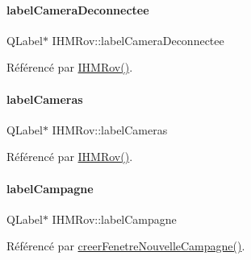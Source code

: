 \mbox{\label{class_i_h_m_rov_ac3b86335f9903c2a71eafe941d5c302b}} 
\paragraph{\texorpdfstring{label\+Camera\+Deconnectee}{labelCameraDeconnectee}}
{\footnotesize\ttfamily Q\+Label$\ast$ I\+H\+M\+Rov\+::label\+Camera\+Deconnectee\hspace{0.3cm}{\ttfamily [private]}}



Référencé par \hyperlink{class_i_h_m_rov_a5dac1fb4612866cc61f699a415e0ef6b}{I\+H\+M\+Rov()}.

\mbox{\label{class_i_h_m_rov_aebce213bf418897dc8a775cfc180ff59}} 
\paragraph{\texorpdfstring{label\+Cameras}{labelCameras}}
{\footnotesize\ttfamily Q\+Label$\ast$ I\+H\+M\+Rov\+::label\+Cameras\hspace{0.3cm}{\ttfamily [private]}}



Référencé par \hyperlink{class_i_h_m_rov_a5dac1fb4612866cc61f699a415e0ef6b}{I\+H\+M\+Rov()}.

\mbox{\label{class_i_h_m_rov_a3ae7bec5b8f85f779ab58ba60556b37f}} 
\paragraph{\texorpdfstring{label\+Campagne}{labelCampagne}}
{\footnotesize\ttfamily Q\+Label$\ast$ I\+H\+M\+Rov\+::label\+Campagne\hspace{0.3cm}{\ttfamily [private]}}



Référencé par \hyperlink{class_i_h_m_rov_a08bf623a890df272f738c1ff8631213f}{creer\+Fenetre\+Nouvelle\+Campagne()}.

